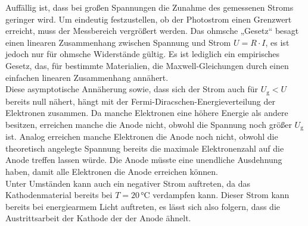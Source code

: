 Auffällig ist, dass bei großen Spannungen die Zunahme des gemessenen Stroms geringer wird. 
Um eindeutig festzustellen, ob der Photostrom einen Grenzwert erreicht, muss der Messbereich vergrößert werden.
Das ohmsche „Gesetz“ besagt einen linearen Zusammenhang zwischen Spannung und Strom $ U = R \cdot I $, es ist jedoch nur für ohmsche Widerstände gültig.  
Es ist lediglich ein empirisches Gesetz, das, für bestimmte Materialien, die Maxwell-Gleichungen durch einen einfachen linearen Zusammenhang annähert. \\

Diese asymptotische Annäherung sowie, dass sich der Strom auch für $U_\text{g} < U$ bereits null nähert, hängt mit der Fermi-Diracschen-Energieverteilung der Elektronen zusammen.
Da manche Elektronen eine höhere Energie als andere besitzen, erreichen manche die Anode nicht, obwohl die Spannung noch größer $U_\text{g}$ ist.
Analog erreichen manche Elektronen die Anode noch nicht, obwohl die theoretisch angelegte Spannung bereits die maximale Elektronenzahl auf die Anode treffen lassen würde. Die Anode müsste eine unendliche Ausdehnung haben, damit alle Elektronen die Anode erreichen können. \\

Unter Umständen kann auch ein negativer Strom auftreten, da das Kathodenmaterial bereits bei $T = 20 \,\si{\celsius}$ verdampfen kann.
Dieser Strom kann bereits bei energiearmem Licht auftreten, es lässt sich also folgern, dass die Austrittsarbeit der Kathode der der Anode ähnelt.


